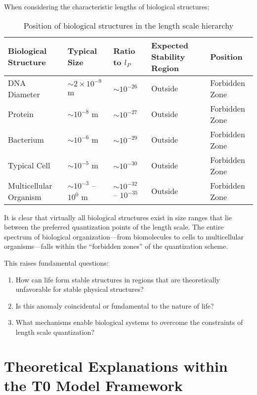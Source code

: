\documentclass[12pt,a4paper]{article}
\begin{document}
	When considering the characteristic lengths of biological structures:
	
	\begin{table}[h]
		\centering
		\begin{adjustbox}{scale=0.7}
			\begin{tabular}{lllll}
				\hline
				\textbf{Biological Structure} & \textbf{Typical Size} & \textbf{Ratio to $l_P$} & \textbf{Expected Stability Region} & \textbf{Position} \\
				\hline
				DNA Diameter & $\sim 2 \times 10^{-9}$ m & $\sim 10^{-26}$ & Outside & Forbidden Zone \\
				Protein & $\sim 10^{-8}$ m & $\sim 10^{-27}$ & Outside & Forbidden Zone \\
				Bacterium & $\sim 10^{-6}$ m & $\sim 10^{-29}$ & Outside & Forbidden Zone \\
				Typical Cell & $\sim 10^{-5}$ m & $\sim 10^{-30}$ & Outside & Forbidden Zone \\
				Multicellular Organism & $\sim 10^{-3}$ – $10^{0}$ m & $\sim 10^{-32}$ – $10^{-35}$ & Outside & Forbidden Zone \\
				\hline
			\end{tabular}
		\end{adjustbox}
		\caption{Position of biological structures in the length scale hierarchy}
		\label{tab:bio_structures}
	\end{table}
	
	It is clear that virtually all biological structures exist in size ranges that lie between the preferred quantization points of the length scale. The entire spectrum of biological organization—from biomolecules to cells to multicellular organisms—falls within the ``forbidden zones'' of the quantization scheme.
	
	This raises fundamental questions:
	\begin{enumerate}
		\item How can life form stable structures in regions that are theoretically unfavorable for stable physical structures?
		\item Is this anomaly coincidental or fundamental to the nature of life?
		\item What mechanisms enable biological systems to overcome the constraints of length scale quantization?
	\end{enumerate}
	
	\section{Theoretical Explanations within the T0 Model Framework}
	
\end{document}
